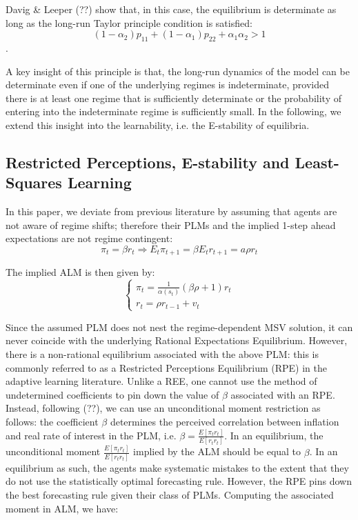 \documentclass[12pt,reqno]{article}
\numberwithin{equation}{section}
\begin{document}
Davig \& Leeper (??) show that, in this case, the equilibrium is determinate as long as the long-run Taylor principle condition is satisfied: \\


$$ (1-\alpha_2) p_{11} +(1-\alpha_1) p_{22} + \alpha_1 \alpha_2 > 1 $$. 

A key insight of this principle is that, the long-run dynamics of the model can be determinate even if one of the underlying regimes is indeterminate, provided there is at least one regime that is sufficiently determinate or the probability of entering into the indeterminate regime is sufficiently small. In the following, we extend this insight into the learnability, i.e. the E-stability of equilibria. 


 \subsection{Restricted Perceptions, E-stability and Least-Squares Learning}

In this paper, we deviate from previous literature by assuming that agents are not aware of regime shifts; therefore their PLMs and the implied 1-step ahead expectations are not regime contingent: \\

$$
\pi_t = \beta r_t  \Rightarrow E_t \pi_{t+1} = \beta E_t r_{t+1} = a \rho r_t 
$$

The implied ALM is then given by: \\

$$
\begin{cases}
\pi_t = \frac{1}{\alpha(s_t)} (\beta \rho + 1) r_t \\
r_t= \rho r_{t-1} + v_t 
\end{cases}
$$ 

Since the assumed PLM does not nest the regime-dependent MSV solution, it can never coincide with the underlying Rational Expectations Equilibrium. However, there is a non-rational equilibrium associated with the above PLM: this is commonly referred to as a Restricted Perceptions Equilibrium (RPE) in the adaptive learning literature. Unlike a REE, one cannot use the method of undetermined coefficients to pin down the value of $\beta$ associated with an RPE. Instead, following (??), we can use an unconditional moment restriction as follows: the coefficient $\beta$ determines the {perceived correlation} between inflation and real rate of interest in the PLM, i.e.   $\beta=\frac{E [\pi_t r_t]}{E[r_t r_t]} $. In an equilibrium, the unconditional moment $\frac{E [\pi_t r_t]}{E[r_t r_t]} $ implied by the ALM should be equal to $\beta$. In an equilibrium as such, the agents make systematic mistakes to the extent that they do not use the statistically optimal forecasting rule. However, the RPE pins down the best forecasting rule given their class of PLMs. Computing the associated moment in ALM, we have: \\
\end{document}
